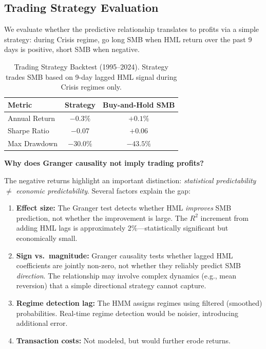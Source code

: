 \documentclass[sigconf]{acmart}
\begin{document}
\subsection{Trading Strategy Evaluation}
\label{sec:trading}

We evaluate whether the predictive relationship translates to profits via a simple
strategy: during Crisis regime, go long SMB when HML return over the past 9 days
is positive, short SMB when negative.

\begin{table}[t]
\centering
\caption{Trading Strategy Backtest (1995--2024). Strategy trades SMB based on
9-day lagged HML signal during Crisis regimes only.}
\label{tab:trading}
\begin{tabular}{lcc}
\toprule
Metric & Strategy & Buy-and-Hold SMB \\
\midrule
Annual Return & $-0.3\%$ & $+0.1\%$ \\
Sharpe Ratio & $-0.07$ & $+0.06$ \\
Max Drawdown & $-30.0\%$ & $-43.5\%$ \\
\bottomrule
\end{tabular}
\end{table}

\textbf{Why does Granger causality not imply trading profits?}

The negative returns highlight an important distinction: \emph{statistical predictability}
$\neq$ \emph{economic predictability}. Several factors explain the gap:

\begin{enumerate}
    \item \textbf{Effect size:} The Granger test detects whether HML \emph{improves}
    SMB prediction, not whether the improvement is large. The $R^2$ increment from
    adding HML lags is approximately 2\%---statistically significant but economically small.

    \item \textbf{Sign vs.\ magnitude:} Granger causality tests whether lagged HML
    coefficients are jointly non-zero, not whether they reliably predict SMB \emph{direction}.
    The relationship may involve complex dynamics (e.g., mean reversion) that a simple
    directional strategy cannot capture.

    \item \textbf{Regime detection lag:} The HMM assigns regimes using filtered
    (smoothed) probabilities. Real-time regime detection would be noisier, introducing
    additional error.

    \item \textbf{Transaction costs:} Not modeled, but would further erode returns.
\end{enumerate}
\end{document}
